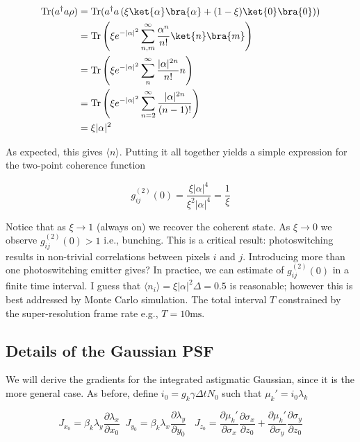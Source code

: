 \begin{align*}
\mathrm{Tr}(a^{\dagger}a\rho) &= \mathrm{Tr}(a^{\dagger}a \left(\xi\ket{\alpha}\bra{\alpha} + (1-\xi)\ket{0}\bra{0}\right))\\
&= \mathrm{Tr}\left(\xi e^{-|\alpha|^{2}}\sum_{n,m}^{\infty}\frac{\alpha^{n}}{n!}\ket{n}\bra{m} \right)\\
&= \mathrm{Tr}\left(\xi e^{-|\alpha|^{2}}\sum_{n}^{\infty}\frac{|\alpha|^{2n}}{n!}n\right)\\
&= \mathrm{Tr}\left(\xi e^{-|\alpha|^{2}}\sum_{n=2}^{\infty}\frac{|\alpha|^{2n}}{(n-1)!}\right)\\
&= \xi|\alpha|^{2}
\end{align*}

As expected, this gives $\langle n\rangle$. Putting it all together yields a simple expression for the two-point coherence function

\begin{equation*}
g^{(2)}_{ij}(0) = \frac{\xi|\alpha|^{4}}{\xi^{2}|\alpha|^{4}} = \frac{1}{\xi}
\end{equation*}

Notice that as $\xi\rightarrow 1$ (always on) we recover the coherent state. As $\xi\rightarrow 0$ we observe $g^{(2)}_{ij}(0) > 1$ i.e., bunching. This is a critical result: photoswitching results in non-trivial correlations between pixels $i$ and $j$. Introducing more than one photoswitching emitter gives? In practice, we can estimate of $g^{(2)}_{ij}(0)$ in a finite time interval. I guess that $\langle n_{i}\rangle = \xi |\alpha|^{2}\Delta = 0.5$ is reasonable; however this is best addressed by Monte Carlo simulation. The total interval $T$ constrained by the super-resolution frame rate e.g., $T=10\mathrm{ms}$. 



\subsection{Details of the Gaussian PSF}

We will derive the gradients for the integrated astigmatic Gaussian, since it is the more general case. As before, define $i_{0} = g_{k}\gamma\Delta t N_{0}$ such that $\mu_{k}' = i_{0}\lambda_{k}$

\begin{equation*}
J_{x_{0}} = \beta_{k}\lambda_{y}\frac{\partial \lambda_{x}}{\partial x_{0}} \;\; J_{y_{0}} = \beta_{k}\lambda_{x}\frac{\partial \lambda_{y}}{\partial y_{0}}\;\;\; J_{z_{0}}  = \frac{\partial \mu_{k}'}{\partial \sigma_{x}}\frac{\partial \sigma_{x}}{\partial z_{0}} + \frac{\partial \mu_{k}'}{\partial \sigma_{y}}\frac{\partial \sigma_{y}}{\partial z_{0}}
\end{equation*}

